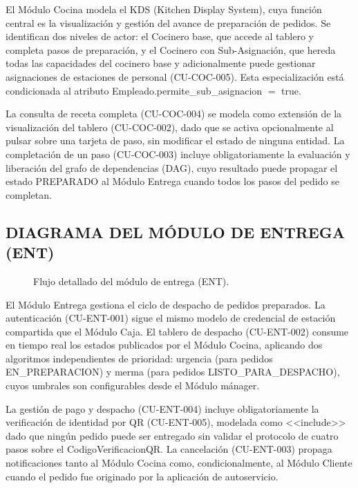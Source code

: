El Módulo Cocina modela el KDS (Kitchen Display System), cuya función central es la visualización y gestión del avance de preparación de pedidos. Se identifican dos niveles de actor: el Cocinero base, que accede al tablero y completa pasos de preparación, y el Cocinero con Sub-Asignación, que hereda todas las capacidades del cocinero base y adicionalmente puede gestionar asignaciones de estaciones de personal (CU-COC-005). Esta especialización está condicionada al atributo Empleado.permite\_sub\_asignacion $=$ true.  

La consulta de receta completa (CU-COC-004) se modela como extensión de la visualización del tablero (CU-COC-002), dado que se activa opcionalmente al pulsar sobre una tarjeta de paso, sin modificar el estado de ninguna entidad. La completación de un paso (CU-COC-003) incluye obligatoriamente la evaluación y liberación del grafo de dependencias (DAG), cuyo resultado puede propagar el estado PREPARADO al Módulo Entrega cuando todos los pasos del pedido se completan. 

\subsection{DIAGRAMA DEL MÓDULO DE ENTREGA (ENT)}
\begin{figure}[H]
    \centering
    
    \caption{Flujo detallado del módulo de entrega (ENT).}
    \label{fig:casos_uso_entrega}
\end{figure}

El Módulo Entrega gestiona el ciclo de despacho de pedidos preparados. La autenticación (CU-ENT-001) sigue el mismo modelo de credencial de estación compartida que el Módulo Caja. El tablero de despacho (CU-ENT-002) consume en tiempo real los estados publicados por el Módulo Cocina, aplicando dos algoritmos independientes de prioridad: urgencia (para pedidos EN\_PREPARACION) y merma (para pedidos LISTO\_PARA\_DESPACHO), cuyos umbrales son configurables desde el Módulo mánager.  

La gestión de pago y despacho (CU-ENT-004) incluye obligatoriamente la verificación de identidad por QR (CU-ENT-005), modelada como <<include>> dado que ningún pedido puede ser entregado sin validar el protocolo de cuatro pasos sobre el CodigoVerificacionQR. La cancelación (CU-ENT-003) propaga notificaciones tanto al Módulo Cocina como, condicionalmente, al Módulo Cliente cuando el pedido fue originado por la aplicación de autoservicio.

